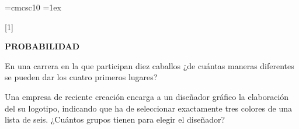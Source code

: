 \documentclass[12pt]{article}
\begin{document}
\font\sc=cmcsc10
\parskip=1ex
{}
\setcounter{problemes}{0}


\newenvironment{prob}{\vskip 0.25cm\addtocounter{problemes}{1}
\noindent{\textbf{\theproblemes.- }}}


\newcommand{\sol}[1]{{\textbf{ }}}

\newcommand{\probl}{\vskip 0.25cm\addtocounter{problemes}{1}
\noindent{\textbf{\theproblemes.- }}}









\begin{centerline}
{{\bf PROBABILIDAD}}
\end{centerline}


\newcommand{\pr}[1]{P(#1)}




\probl  En una carrera en la que participan diez caballos ¿de
cuántas maneras diferentes se pueden dar los cuatro primeros
lugares? 

\probl  Una empresa de reciente creación encarga a un diseñador gráfico la elaboración
del su logotipo, indicando que ha de seleccionar exactamente tres colores de una lista de
seis. ¿Cuántos grupos tienen para elegir el diseñador? 
\end{document}
